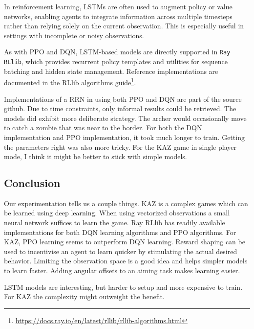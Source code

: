 In reinforcement learning, LSTMs are often used to augment policy or value
networks, enabling agents to integrate information across multiple timesteps
rather than relying solely on the current observation. This is especially
useful in settings with incomplete or noisy observations.

As with PPO and DQN, LSTM-based models are directly supported in
\texttt{Ray RLlib}, which provides recurrent policy templates and utilities for
sequence batching and hidden state management. Reference implementations are
documented in the RLlib algorithms guide\footnote{\url{https://docs.ray.io/en/latest/rllib/rllib-algorithms.html}}.

Implementations of a RRN in using both PPO and DQN are part of the source github. Due to time constraints, only informal results could be retrieved. The models did exhibit more deliberate strategy. The archer would occasionally move to catch a zombie that was near to the border. For both the DQN implementation and PPO implementation, it took much longer to train. Getting the parameters right was also more tricky. For the KAZ game in single player mode, I think it might be better to stick with simple models. 

\subsection{Conclusion}
Our experimentation tells us a couple things. KAZ is a complex games which can be learned using deep learning. When using vectorized observations a small neural network suffices to learn the game. Ray RLlib has readily available implementations for both DQN learning algorithms and PPO algorithms. For KAZ, PPO learning seems to outperform DQN learning. Reward shaping can be used to incentivise an agent to learn quicker by stimulating the actual desired behavior. Limiting the observation space is a good idea and helps simpler models to learn faster. Adding angular offsets to an aiming task makes learning easier. 

LSTM models are interesting, but harder to setup and more expensive to train. For KAZ the complexity might outweight the benefit.